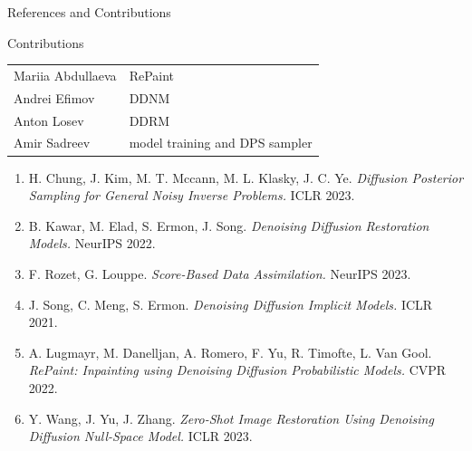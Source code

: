 \documentclass[9pt]{beamer}
\begin{document}
\begin{frame}{References and Contributions}

\begin{block}{Contributions}
\begin{tabular}{ll}
Mariia Abdullaeva & RePaint \\
Andrei Efimov & DDNM \\
Anton Losev & DDRM \\
Amir Sadreev & model training and DPS sampler \\
\end{tabular}
\end{block}
\vspace{0.1cm}

\scriptsize
\begin{enumerate}
  \item H. Chung, J. Kim, M. T. Mccann, M. L. Klasky, J. C. Ye.
        \textit{Diffusion Posterior Sampling for General Noisy Inverse Problems.}
        ICLR 2023.
  \item B. Kawar, M. Elad, S. Ermon, J. Song.
        \textit{Denoising Diffusion Restoration Models.}
        NeurIPS 2022.
  \item F. Rozet, G. Louppe.
        \textit{Score-Based Data Assimilation.}
        NeurIPS 2023.
  \item J. Song, C. Meng, S. Ermon.
        \textit{Denoising Diffusion Implicit Models.}
        ICLR 2021.
  \item A. Lugmayr, M. Danelljan, A. Romero, F. Yu, R. Timofte, L. Van Gool.
        \textit{RePaint: Inpainting using Denoising Diffusion Probabilistic Models.}
        CVPR 2022.
  \item Y. Wang, J. Yu, J. Zhang.
        \textit{Zero-Shot Image Restoration Using Denoising Diffusion Null-Space Model.}
        ICLR 2023.
\end{enumerate}
\end{frame}

\end{document}

